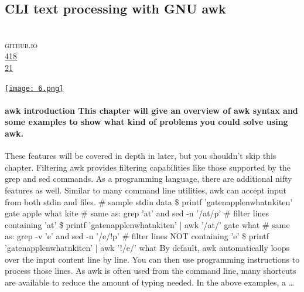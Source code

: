 \documentclass[10pt,a4paper]{article}
\begin{document}
\subsection{CLI text processing with GNU awk}
\noindent\begin{minipage}[t]{0.19\linewidth}
\vspace{0pt}
\noindent\scshape\footnotesize
\\ {\scriptsize\faGlobe}\space 
github.io
\\ {\scriptsize\faThumbsOUp}\space 
\href{http://news.ycombinator.com/item?id=37290356\&utm\_term=comment}{418} 
\\ {\scriptsize\faComments}\space 
\href{http://news.ycombinator.com/item?id=37290356\&utm\_term=comment}{21} 
\end{minipage} 
\begin{minipage}[t]{0.80\linewidth}
\vspace{0pt}
\begin{multicols}{2}
    \href{https://learnbyexample.github.io/learn\_gnuawk/awk-introduction.html?utm\_source=hackernewsletter\&utm\_medium=email\&utm\_term=fav}{
        \texttt{[image: 6.png]}
    }
\paragraph{awk introduction
This chapter will give an overview of
awk syntax and some examples to show what kind of problems you could solve using
awk.}
 These features will be covered in depth in later, but you shouldn't skip this chapter.
Filtering
awk provides filtering capabilities like those supported by the
grep and
sed commands. As a programming language, there are additional nifty features as well. Similar to many command line utilities,
awk can accept input from both stdin and files.
\# sample stdin data \$ printf 'gatenapplenwhatnkiten' gate apple what kite \# same as: grep 'at' and sed -n '/at/p' \# filter lines containing 'at' \$ printf 'gatenapplenwhatnkiten' | awk '/at/' gate what \# same as: grep -v 'e' and sed -n '/e/!p' \# filter lines NOT containing 'e' \$ printf 'gatenapplenwhatnkiten' | awk '!/e/' what
By default,
awk automatically loops over the input content line by line. You can then use programming instructions to process those lines. As
awk is often used from the command line, many shortcuts are available to reduce the amount of typing needed.
In the above examples, a
\dots
\end{multicols}
\end{minipage}
\par\medskip
\end{document}
